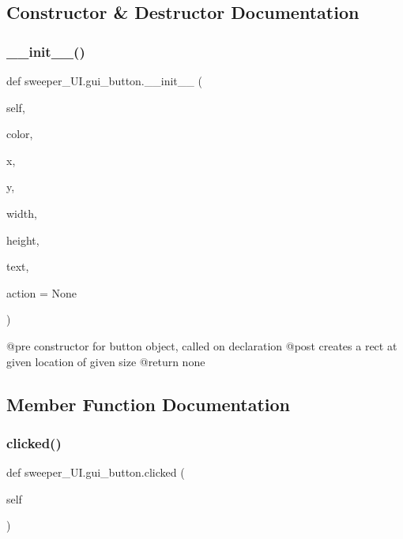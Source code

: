 \subsection{Constructor \& Destructor Documentation}
\mbox{\label{classsweeper___u_i_1_1gui__button_a0d9c0c788a776c9d8663a285852fe998}} 
\subsubsection{\texorpdfstring{\+\_\+\+\_\+init\+\_\+\+\_\+()}{\_\_init\_\_()}}
{\footnotesize\ttfamily def sweeper\+\_\+\+U\+I.\+gui\+\_\+button.\+\_\+\+\_\+init\+\_\+\+\_\+ (\begin{DoxyParamCaption}\item[{}]{self,  }\item[{}]{color,  }\item[{}]{x,  }\item[{}]{y,  }\item[{}]{width,  }\item[{}]{height,  }\item[{}]{text,  }\item[{}]{action = {\ttfamily None} }\end{DoxyParamCaption})}

\begin{DoxyVerb}@pre constructor for button object, called on declaration
@post creates a rect at given location of given size
@return none
\end{DoxyVerb}
 

\subsection{Member Function Documentation}
\mbox{\label{classsweeper___u_i_1_1gui__button_af74950231e0ddbcb8582404a8320dee5}} 
\subsubsection{\texorpdfstring{clicked()}{clicked()}}
{\footnotesize\ttfamily def sweeper\+\_\+\+U\+I.\+gui\+\_\+button.\+clicked (\begin{DoxyParamCaption}\item[{}]{self }\end{DoxyParamCaption})}


